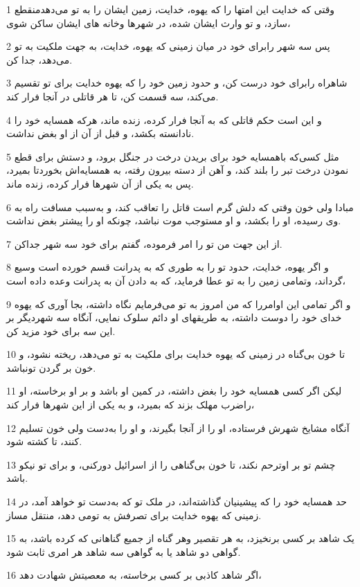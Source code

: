 \par 1 وقتی که خدایت این امتها را که یهوه، خدایت، زمین ایشان را به تو می‌دهدمنقطع سازد، و تو وارث ایشان شده، در شهرها وخانه های ایشان ساکن شوی،
\par 2 پس سه شهر رابرای خود در میان زمینی که یهوه، خدایت، به جهت ملکیت به تو می‌دهد، جدا کن.
\par 3 شاهراه رابرای خود درست کن، و حدود زمین خود را که یهوه خدایت برای تو تقسیم می‌کند، سه قسمت کن، تا هر قاتلی در آنجا فرار کند.
\par 4 و این است حکم قاتلی که به آنجا فرار کرده، زنده ماند، هر‌که همسایه خود را نادانسته بکشد، و قبل از آن از او بغض نداشت.
\par 5 مثل کسی‌که باهمسایه خود برای بریدن درخت در جنگل برود، و دستش برای قطع نمودن درخت تبر را بلند کند، و آهن از دسته بیرون رفته، به همسایه‌اش بخوردتا بمیرد، پس به یکی از آن شهرها فرار کرده، زنده ماند.
\par 6 مبادا ولی خون وقتی که دلش گرم است قاتل را تعاقب کند، و به‌سبب مسافت راه به وی رسیده، او را بکشد، و او مستوجب موت نباشد، چونکه او را پیشتر بغض نداشت.
\par 7 از این جهت من تو را امر فرموده، گفتم برای خود سه شهر جداکن.
\par 8 و اگر یهوه، خدایت، حدود تو را به طوری که به پدرانت قسم خورده است وسیع گرداند، وتمامی زمین را به تو عطا فرماید، که به دادن آن به پدرانت وعده داده است،
\par 9 و اگر تمامی این اوامررا که من امروز به تو می‌فرمایم نگاه داشته، بجا آوری که یهوه خدای خود را دوست داشته، به طریقهای او دائم سلوک نمایی، آنگاه سه شهردیگر بر این سه برای خود مزید کن.
\par 10 تا خون بی‌گناه در زمینی که یهوه خدایت برای ملکیت به تو می‌دهد، ریخته نشود، و خون بر گردن تونباشد.
\par 11 لیکن اگر کسی همسایه خود را بغض داشته، در کمین او باشد و بر او برخاسته، او راضرب مهلک بزند که بمیرد، و به یکی از این شهرها فرار کند،
\par 12 آنگاه مشایخ شهرش فرستاده، او را از آنجا بگیرند، و او را به‌دست ولی خون تسلیم کنند، تا کشته شود.
\par 13 چشم تو بر اوترحم نکند، تا خون بی‌گناهی را از اسرائیل دورکنی، و برای تو نیکو باشد.
\par 14 حد همسایه خود را که پیشینیان گذاشته‌اند، در ملک تو که به‌دست تو خواهد آمد، در زمینی که یهوه خدایت برای تصرفش به تومی دهد، منتقل مساز.
\par 15 یک شاهد بر کسی برنخیزد، به هر تقصیر وهر گناه از جمیع گناهانی که کرده باشد، به گواهی دو شاهد یا به گواهی سه شاهد هر امری ثابت شود.
\par 16 اگر شاهد کاذبی بر کسی برخاسته، به معصیتش شهادت دهد،
